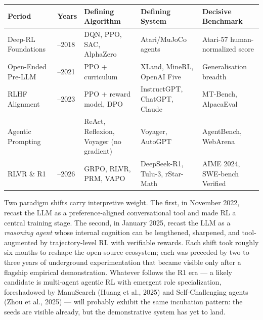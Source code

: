 {\def\LTcaptype{none} %
\begin{longtable}[]{@{}
  >{\raggedright\arraybackslash}p{}
  >{\raggedright\arraybackslash}p{}
  >{\raggedright\arraybackslash}p{}
  >{\raggedright\arraybackslash}p{}
  >{\raggedright\arraybackslash}p{}@{}}
\toprule\noalign{}
\begin{minipage}[b]{\linewidth}\raggedright
Period
\end{minipage} & \begin{minipage}[b]{\linewidth}\raggedright
Years
\end{minipage} & \begin{minipage}[b]{\linewidth}\raggedright
Defining Algorithm
\end{minipage} & \begin{minipage}[b]{\linewidth}\raggedright
Defining System
\end{minipage} & \begin{minipage}[b]{\linewidth}\raggedright
Decisive Benchmark
\end{minipage} \\
\midrule\noalign{}
\endhead
\bottomrule\noalign{}
\endlastfoot
Deep-RL Foundations & 2013--2018 & DQN, PPO, SAC, AlphaZero & Atari/MuJoCo agents & Atari-57 human-normalized score \\
Open-Ended Pre-LLM & 2018--2021 & PPO + curriculum & XLand, MineRL, OpenAI Five & Generalisation breadth \\
RLHF Alignment & 2022--2023 & PPO + reward model, DPO & InstructGPT, ChatGPT, Claude & MT-Bench, AlpacaEval \\
Agentic Prompting & 2023 & ReAct, Reflexion, Voyager (no gradient) & Voyager, AutoGPT & AgentBench, WebArena \\
RLVR \& R1 & 2024--2026 & GRPO, RLVR, PRM, VAPO & DeepSeek-R1, Tulu-3, rStar-Math & AIME 2024, SWE-bench Verified \\
\end{longtable}
}

Two paradigm shifts carry interpretive weight. The first, in November 2022, recast the LLM as a preference-aligned conversational tool and made RL a central training stage. The second, in January 2025, recast the LLM as a \emph{reasoning agent} whose internal cognition can be lengthened, sharpened, and tool-augmented by trajectory-level RL with verifiable rewards. Each shift took roughly six months to reshape the open-source ecosystem; each was preceded by two to three years of underground experimentation that became visible only after a flagship empirical demonstration. Whatever follows the R1 era --- a likely candidate is multi-agent agentic RL with emergent role specialization, foreshadowed by ManuSearch (Huang et al., 2025) and Self-Challenging agents (Zhou et al., 2025) --- will probably exhibit the same incubation pattern: the seeds are visible already, but the demonstrative system has yet to land.

